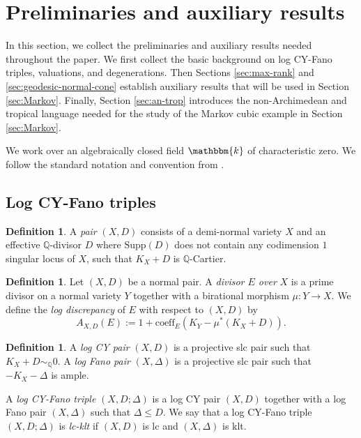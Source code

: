 \documentclass[reqno, 12pt]{amsart}
\theoremstyle{definition}
\newtheorem{defn}[prop]{Definition}
\newcommand{\bQ}{\mathbb{Q}}
\newcommand{\bk}{\mathbbm{k}}
\newcommand{\Supp}{\mathrm{Supp}}
\newcommand{\coeff}{\mathrm{coeff}}
\numberwithin{equation}{section}
\begin{document}
\section{Preliminaries and auxiliary results}\label{sec:prelim}

In this section, we collect the preliminaries and auxiliary results needed throughout the paper.
We first collect the basic background on log CY-Fano triples, valuations, and degenerations. Then  Sections \ref{sec:max-rank} and \ref{sec:geodesic-normal-cone}  establish auxiliary results that will be used in Section \ref{sec:Markov}. Finally, Section \ref{sec:an-trop} introduces the non-Archimedean and tropical language needed for the study of the Markov cubic example in Section \ref{sec:Markov}.

We work over an algebraically closed field $\bk$ of characteristic zero. We follow the standard notation and convention from \cite{KM98, Kol13}. 



\subsection{Log CY-Fano triples}

\begin{defn}
    A \emph{pair} $(X,D)$ consists of a demi-normal variety $X$ and an effective $\bQ$-divisor $D$ where $\Supp(D)$ does not contain any codimension $1$ singular locus of $X$, such that $K_X + D$ is $\bQ$-Cartier.
\end{defn}

\begin{defn}
Let $(X,D)$ be a normal pair. A \emph{divisor $E$ over} $X$ is a prime divisor on a normal variety $Y$ together with a birational morphism $\mu: Y\to X$. We define the \emph{log discrepancy} of $E$ with respect to $(X,D)$ by
\[
A_{X,D}(E):= 1 + \coeff_E(K_Y - \mu^*(K_X+D)).
\]
\end{defn}

\begin{defn}
A \emph{log CY pair} $(X,D)$ is a projective slc pair such that $K_X + D\sim_{\bQ} 0$. A \emph{log Fano pair} $(X,\Delta)$ is a projective slc pair such that $-K_X - \Delta$ is ample. 

A \emph{log CY-Fano triple} $(X,D;\Delta)$ is a log CY pair $(X,D)$ together with a log Fano pair $(X,\Delta)$ such that $\Delta \leq D$. We say that a log CY-Fano triple $(X,D;\Delta)$ is \emph{lc-klt} if $(X,D)$ is lc and $(X,\Delta)$ is klt.
\end{defn}
\end{document}
